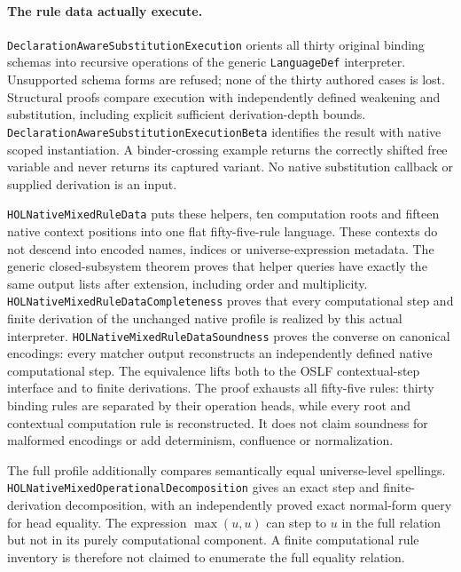 \documentclass[11pt]{article}
\theoremstyle{definition}
\theoremstyle{remark}
\begin{document}
\paragraph{The rule data actually execute.}
\nolinkurl{DeclarationAwareSubstitutionExecution} orients all thirty
original binding schemas into recursive operations of the generic
\texttt{LanguageDef} interpreter. Unsupported schema forms are refused;
none of the thirty authored cases is lost. Structural proofs compare
execution with independently defined weakening and substitution, including
explicit sufficient derivation-depth bounds.
\nolinkurl{DeclarationAwareSubstitutionExecutionBeta} identifies the
result with native scoped instantiation. A binder-crossing example returns
the correctly shifted free variable and never returns its captured variant.
No native substitution callback or supplied derivation is an input.

\nolinkurl{HOLNativeMixedRuleData} puts these helpers, ten computation
roots and fifteen native context positions into one flat fifty-five-rule
language. These contexts do not descend into encoded names, indices or
universe-expression metadata. The generic closed-subsystem theorem proves
that helper queries have exactly the same output lists after extension,
including order and multiplicity.
\nolinkurl{HOLNativeMixedRuleDataCompleteness} proves that every
computational step and finite derivation of the unchanged native profile
is realized by this actual interpreter.
\nolinkurl{HOLNativeMixedRuleDataSoundness} proves the converse on canonical
encodings: every matcher output reconstructs an independently defined native
computational step. The equivalence lifts both to the OSLF contextual-step
interface and to finite derivations. The proof exhausts all fifty-five rules:
thirty binding rules are separated by their operation heads, while every
root and contextual computation rule is reconstructed. It does not claim
soundness for malformed encodings or add determinism, confluence or
normalization.

The full profile additionally compares semantically equal universe-level
spellings. \nolinkurl{HOLNativeMixedOperationalDecomposition} gives
an exact step and finite-derivation decomposition, with an independently
proved exact normal-form query for head equality. The expression
\(\max(u,u)\) can step to \(u\) in the full relation but not in its
purely computational component. A finite computational rule inventory is
therefore not claimed to enumerate the full equality relation.
\end{document}
